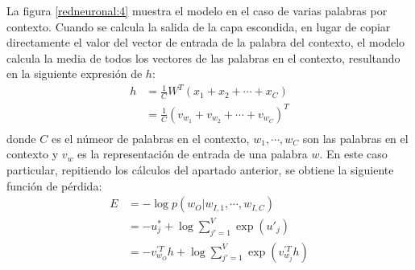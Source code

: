 La figura \ref{redneuronal:4} muestra el modelo en el caso de varias palabras por contexto. Cuando se calcula la salida de la capa
escondida, en lugar de copiar directamente el valor del vector de entrada de la palabra del contexto, el modelo calcula la media
de todos los vectores de las palabras en el contexto, resultando en la siguiente expresión de $h$:
\begin{equation}
  \begin{split}
     h & = \frac{1}{C} W^T \left( x_1 + x_2 + \cdots + x_C \right)\\
       & = \frac{1}{C} \left( v_{w_1} + v_{w_2} + \cdots + v_{w_C} \right)^T\\
    \end{split}
\end{equation}
donde $C$ es el númeor de palabras en el contexto, $w_1, \cdots, w_C$ son las palabras en el contexto y $v_w$ es la representación de entrada
de una palabra $w$. En este caso particular, repitiendo los cálculos del apartado anterior, se obtiene la siguiente función de pérdida:
\begin{equation}
  \begin{split}
    E & = -\log p\left( w_O | w_{I,1}, \cdots, w_{I, C} \right) \\
      & = -u_j^* + \log\displaystyle\sum_{j'=1}^V\exp\left(u'_j\right) \\
      & = -v_{w_O}^{'T}h + \log\displaystyle\sum_{j'=1}^V\exp\left( v_{w_j}^{'T}h \right) \\
  \end{split}
\end{equation}

